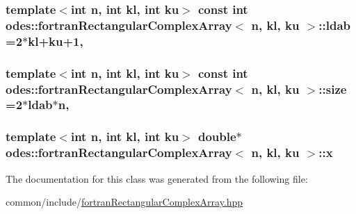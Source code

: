 \hypertarget{classodes_1_1fortranRectangularComplexArray_a44b92ded1ed0bf332322a6f4ed439db5}{
\subsubsection[{ldab}]{\setlength{\rightskip}{0pt plus 5cm}template$<$int n, int kl, int ku$>$ const int {\bf odes\-::fortran\-Rectangular\-Complex\-Array}$<$ n, kl, ku $>$\-::ldab =2$\ast$kl+ku+1\hspace{0.3cm}{\ttfamily [static]}, {\ttfamily [private]}}}\label{classodes_1_1fortranRectangularComplexArray_a44b92ded1ed0bf332322a6f4ed439db5}
\hypertarget{classodes_1_1fortranRectangularComplexArray_a92dd60f10c597b14d4a38502ab291cba}{
\subsubsection[{size}]{\setlength{\rightskip}{0pt plus 5cm}template$<$int n, int kl, int ku$>$ const int {\bf odes\-::fortran\-Rectangular\-Complex\-Array}$<$ n, kl, ku $>$\-::size =2$\ast${\bf ldab}$\ast$n\hspace{0.3cm}{\ttfamily [static]}, {\ttfamily [private]}}}\label{classodes_1_1fortranRectangularComplexArray_a92dd60f10c597b14d4a38502ab291cba}
\hypertarget{classodes_1_1fortranRectangularComplexArray_a04409d9c6123c7ab97b2c9599ddec0cd}{
\subsubsection[{x}]{\setlength{\rightskip}{0pt plus 5cm}template$<$int n, int kl, int ku$>$ double$\ast$ {\bf odes\-::fortran\-Rectangular\-Complex\-Array}$<$ n, kl, ku $>$\-::x\hspace{0.3cm}{\ttfamily [private]}}}\label{classodes_1_1fortranRectangularComplexArray_a04409d9c6123c7ab97b2c9599ddec0cd}


The documentation for this class was generated from the following file\-:\begin{DoxyCompactItemize}
\item 
common/include/\hyperlink{fortranRectangularComplexArray_8hpp}{fortran\-Rectangular\-Complex\-Array.\-hpp}\end{DoxyCompactItemize}
